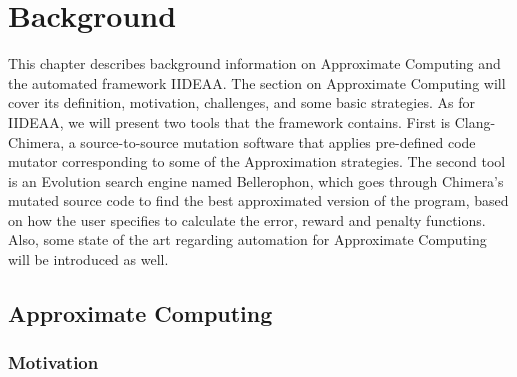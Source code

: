 \chapter{Background}

This chapter describes background information on Approximate Computing and the automated framework IIDEAA. The section on Approximate Computing will cover its definition, motivation, challenges, and some basic strategies. As for IIDEAA, we will present two tools that the framework contains. First is Clang-Chimera, a source-to-source mutation software that applies pre-defined code mutator corresponding to some of the Approximation strategies. The second tool is an Evolution search engine named Bellerophon, which goes through Chimera's mutated source code to find the best approximated version of the program, based on how the user specifies to calculate the error, reward and penalty functions. Also, some state of the art regarding automation for Approximate Computing will be introduced as well.\\

\section{Approximate Computing}

\subsection{Motivation}

